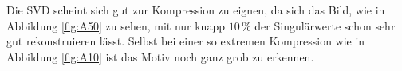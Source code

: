 \documentclass{scrartcl}
\begin{document}
        Die SVD scheint sich gut zur Kompression zu eignen, da sich das Bild, wie in Abbildung \ref{fig:A50} zu sehen, mit nur knapp
        $10 \, \%$ der Singulärwerte schon sehr gut rekonstruieren lässt. Selbst bei einer so extremen Kompression wie in Abbildung
        \ref{fig:A10} ist das Motiv noch ganz grob zu erkennen.
        
\end{document}
